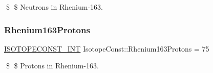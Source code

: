 \$ \$ Neutrons in Rhenium-\/163. \mbox{\label{group___isotope_const-_rhenium-_re163_ga5c99002f25343980e7a7c523e4124475}} 
\subsubsection{\texorpdfstring{Rhenium163\+Protons}{Rhenium163Protons}}
{\footnotesize\ttfamily \mbox{\hyperlink{group___isotope_const-_macros_ga5f18360b3e99483a35c32d789e62621c}{I\+S\+O\+T\+O\+P\+E\+C\+O\+N\+S\+T\+\_\+\+I\+NT}} Isotope\+Const\+::\+Rhenium163\+Protons = 75}

\$ \$ Protons in Rhenium-\/163. 